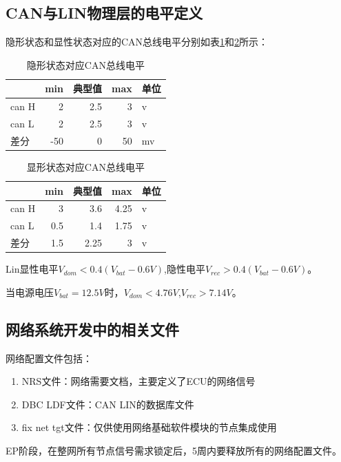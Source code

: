 \subsection{CAN与LIN物理层的电平定义}

隐形状态和显性状态对应的CAN总线电平分别如表\ref{tab:rec_can_level}和\ref{tab:dom_can_level}所示：
\begin{table}[htbp]
    \centering
    \caption{隐形状态对应CAN总线电平}
      \begin{tabular}{lrrrl}
        \toprule
            & \multicolumn{1}{l}{min} & \multicolumn{1}{l}{典型值} & \multicolumn{1}{l}{max} & 单位 \\
        \midrule
      can H & 2     & 2.5   & 3     & v \\
      can L & 2     & 2.5   & 3     & v \\
      差分    & -50   & 0     & 50    & mv \\
      \bottomrule
      \end{tabular}%
    \label{tab:rec_can_level}%
\end{table}%
  
\begin{table}[htbp]
    \centering
    \caption{显形状态对应CAN总线电平}
      \begin{tabular}{lrrrl}
        \toprule
            & \multicolumn{1}{l}{min} & \multicolumn{1}{l}{典型值} & \multicolumn{1}{l}{max} & 单位 \\
        \midrule
      can H & 3     & 3.6   & 4.25  & v \\
      can L & 0.5   & 1.4   & 1.75  & v \\
      差分    & 1.5   & 2.25  & 3     & v \\
      \bottomrule
      \end{tabular}%
    \label{tab:dom_can_level}%
\end{table}%
  
Lin显性电平$V_{dom}<0.4(V_{bat}-0.6V)$,隐性电平$V_{rec}>0.4(V_{bat}-0.6V)$。

当电源电压$V_{bat}=12.5V$时，$V_{dom}<4.76V$,$V_{rec}>7.14V$。

\subsection{网络系统开发中的相关文件}
网络配置文件包括：
\begin{enumerate}
    \item NRS文件：网络需要文档，主要定义了ECU的网络信号
    \item DBC LDF文件：CAN LIN的数据库文件
    \item fix net tgt文件：仅供使用网络基础软件模块的节点集成使用
\end{enumerate}
EP阶段，在整网所有节点信号需求锁定后，5周内要释放所有的网络配置文件。

